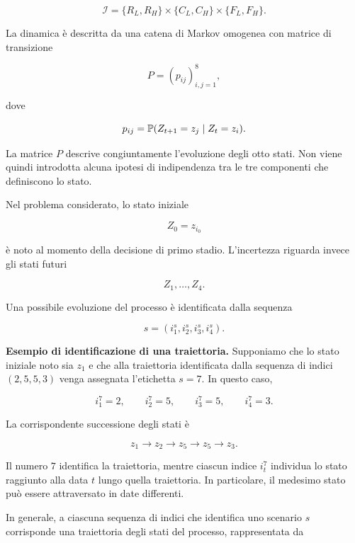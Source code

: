 \[
\mathcal I
=
\{R_L,R_H\}
\times
\{C_L,C_H\}
\times
\{F_L,F_H\}.
\]

La dinamica \`e descritta da una catena di Markov omogenea con matrice di
transizione

\[
P=(p_{ij})_{i,j=1}^{8},
\]

\noindent dove

\begin{equation}
p_{ij}
=
\mathbb{P}(Z_{t+1}=z_j\mid Z_t=z_i).
\label{eq:cap14-transizione-markov}
\end{equation}

La matrice $P$ descrive congiuntamente l'evoluzione degli otto stati.
Non viene quindi introdotta alcuna ipotesi di indipendenza tra le tre
componenti che definiscono lo stato.

Nel problema considerato, lo stato iniziale

\[
Z_0=z_{i_0}
\]

\noindent \`e noto al momento della decisione di primo stadio. L'incertezza riguarda
invece gli stati futuri

\[
Z_1,\ldots,Z_4.
\]

Una possibile evoluzione del processo \`e identificata dalla sequenza

\[
s=(i_1^s,i_2^s,i_3^s,i_4^s).
\]


\medskip

\noindent
\textbf{Esempio di identificazione di una traiettoria.}
Supponiamo che lo stato iniziale noto sia $z_1$ e che alla
traiettoria identificata dalla sequenza di indici
$(2,5,5,3)$ venga assegnata l'etichetta $s=7$. In questo caso,

\[
i_1^7=2,\qquad
i_2^7=5,\qquad
i_3^7=5,\qquad
i_4^7=3.
\]

\noindent La corrispondente successione degli stati \`{e}

\[
z_1\longrightarrow z_2
\longrightarrow z_5
\longrightarrow z_5
\longrightarrow z_3.
\]

\noindent Il numero $7$ identifica la traiettoria, mentre ciascun
indice $i_t^7$ individua lo stato raggiunto alla data $t$
lungo quella traiettoria. In particolare, il medesimo stato
pu\`{o} essere attraversato in date differenti.


\medskip

\noindent
In generale, a ciascuna sequenza di indici che identifica
uno scenario $s$ corrisponde una traiettoria degli stati
del processo, rappresentata da


